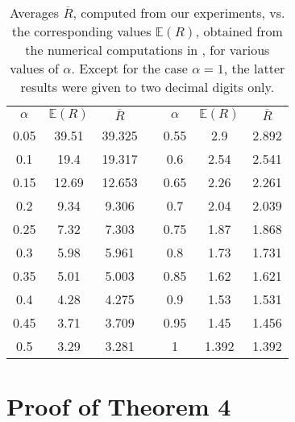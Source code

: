 \documentclass{amsart}
\begin{document}
\begin{table}[!t]
\renewcommand{\arraystretch}{1.3}
\caption{Averages $\overline{R}$, computed from our
experiments, vs. the corresponding values ${\mathbb{E}}(R)$,
obtained from the numerical computations in \cite{KipnisR1990}, for various values of $\alpha$.
Except for the case $\alpha = 1$, the latter results were given to
two decimal digits only.} \label{kr_comparison} \centering
\begin{tabular}{|c|c|c|c|c|c|c|}
\cline{1-3} \cline {5-7}
\bfseries $\alpha$ & ${\mathbb{E}}(R)$ & $\overline{R}$
& &\bfseries $\alpha$ & ${\mathbb{E}}(R)$ & $\overline{R}$\\
\cline{1-3} \cline{5-7} 0.05    &   39.51   &   39.325  &   &   0.55
&   2.9   & 2.892   \\  \cline{1-3} \cline{5-7} 0.1     &   19.4
&   19.317  &   &   0.6     &   2.54  & 2.541   \\  \cline{1-3}
\cline{5-7} 0.15    &   12.69   &   12.653  &   &   0.65    &   2.26
& 2.261   \\  \cline{1-3} \cline{5-7} 0.2     &   9.34    &   9.306
&   &   0.7     &   2.04  & 2.039   \\  \cline{1-3} \cline{5-7} 0.25
&   7.32    &   7.303   &   &   0.75    &   1.87  & 1.868   \\
\cline{1-3} \cline{5-7} 0.3     &   5.98    &   5.961   &   &   0.8
&   1.73  & 1.731   \\  \cline{1-3} \cline{5-7} 0.35    &   5.01
&   5.003   &   &   0.85    &   1.62  & 1.621   \\  \cline{1-3}
\cline{5-7} 0.4     &   4.28    &   4.275   &   &   0.9     &   1.53
& 1.531   \\  \cline{1-3} \cline{5-7} 0.45    &   3.71    &   3.709
&   &   0.95    &   1.45  & 1.456   \\  \cline{1-3} \cline{5-7} 0.5
&   3.29    &   3.281   &   &   1       &   1.392  & 1.392   \\
\cline{1-3} \cline{5-7}
\end{tabular}
\end{table}


\section{Proof of Theorem 4}
\label{app:proof}
\end{document}
